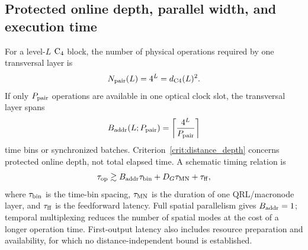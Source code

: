 \documentclass[aps,
prx,
superscriptaddress,
reprint,
longbibliography,
floatfix]{revtex4-2}
\begin{document}
\subsection{Protected online depth, parallel width, and execution time}\label{subsec:online_timing}
For a level-$L$ ${\rm C_4}$ block, the number of physical operations required by one transversal layer is
\begin{equation}
N_{\rm pair}(L)=4^L=d_{\rm C4}(L)^2.
\label{eq:pairing_width}
\end{equation}
If only $P_{\rm pair}$ operations are available in one optical clock slot, the transversal layer spans
\begin{equation}
B_{\rm addr}(L;P_{\rm pair})=
\left\lceil\frac{4^L}{P_{\rm pair}}\right\rceil
\label{eq:address_span}
\end{equation}
time bins or synchronized batches. Criterion~\ref{crit:distance_depth} concerns protected online depth, not total elapsed time. A schematic timing relation is
\begin{equation}
\tau_{\rm op}\gtrsim B_{\rm addr}\tau_{\rm bin}+D_G\tau_{\rm MN}+\tau_{\rm ff},
\label{eq:operation_latency_decomposition}
\end{equation}
where $\tau_{\rm bin}$ is the time-bin spacing, $\tau_{\rm MN}$ is the duration of one QRL/macronode layer, and $\tau_{\rm ff}$ is the feedforward latency. Full spatial parallelism gives $B_{\rm addr}=1$; temporal multiplexing reduces the number of spatial modes at the cost of a longer operation time. First-output latency also includes resource preparation and availability, for which no distance-independent bound is established.
\end{document}
